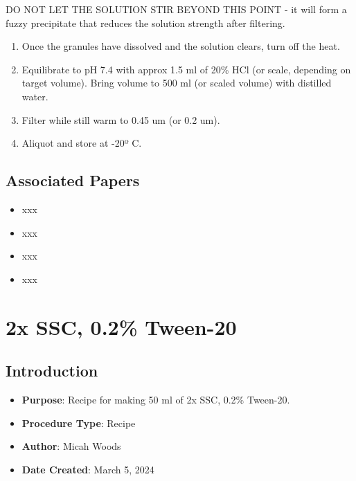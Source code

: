 \documentclass[
  letterpaper,
  DIV=11,
  numbers=noendperiod]{scrreprt}
\providecommand{\tightlist}{%
  \setlength{\itemsep}{0pt}\setlength{\parskip}{0pt}}\usepackage{longtable,booktabs,array}
\begin{document}
DO NOT LET THE SOLUTION STIR BEYOND THIS POINT - it will form a fuzzy
precipitate that reduces the solution strength after filtering.

\begin{enumerate}
\def\labelenumi{\arabic{enumi}.}
\setcounter{enumi}{3}
\tightlist
\item
  Once the granules have dissolved and the solution clears, turn off the
  heat.
\item
  Equilibrate to pH 7.4 with approx 1.5 ml of 20\% HCl (or scale,
  depending on target volume). Bring volume to 500 ml (or scaled volume)
  with distilled water.\\
\item
  Filter while still warm to 0.45 um (or 0.2 um).\\
\item
  Aliquot and store at -20º C.
\end{enumerate}

\hypertarget{associated-papers-66}{%
\section{Associated Papers}\label{associated-papers-66}}

\begin{itemize}
\tightlist
\item
  xxx
\item
  xxx
\item
  xxx
\item
  xxx
\end{itemize}

\hypertarget{sec-recipe-tween20}{%
\chapter{2x SSC, 0.2\% Tween-20}\label{sec-recipe-tween20}}

\hypertarget{introduction-98}{%
\section{Introduction}\label{introduction-98}}

\begin{itemize}
\tightlist
\item
  \textbf{Purpose}: Recipe for making 50 ml of 2x SSC, 0.2\% Tween-20.
\item
  \textbf{Procedure Type}: Recipe
\item
  \textbf{Author}: Micah Woods
\item
  \textbf{Date Created}: March 5, 2024
\end{itemize}
\end{document}
